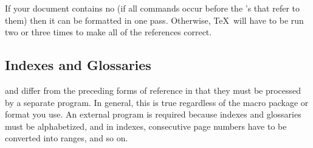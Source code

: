 If your document contains no  (if all
 commands occur before the 's that refer
to them) then it can be formatted in one pass.  Otherwise, \TeX\ will 
have to be run two or three times
to make all of the references correct.

%
%

\subsection{Indexes and Glossaries}

 and  differ from the preceding 
forms of reference in that they
must be processed by a separate program.  In general, this is true
regardless of the macro package or format you use.
An external program is required because indexes and glossaries must be 
alphabetized, and in indexes, 
consecutive page numbers have to be converted into ranges, and so on.

